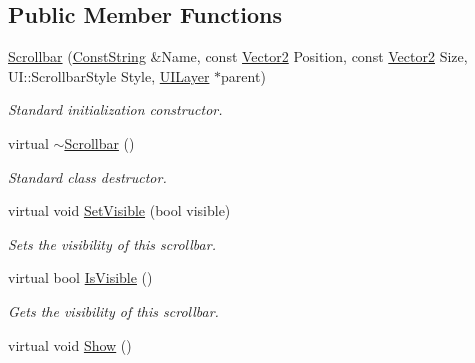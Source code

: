 \subsection*{Public Member Functions}
\begin{DoxyCompactItemize}
\item 
\hyperlink{classphys_1_1UI_1_1Scrollbar_a25d95bba23d00bd2e377258068e4a0bb}{Scrollbar} (\hyperlink{namespacephys_a5ce5049f8b4bf88d6413c47b504ebb31}{ConstString} \&Name, const \hyperlink{classphys_1_1Vector2}{Vector2} Position, const \hyperlink{classphys_1_1Vector2}{Vector2} Size, UI::ScrollbarStyle Style, \hyperlink{classphys_1_1UILayer}{UILayer} $\ast$parent)
\begin{DoxyCompactList}\small\item\em Standard initialization constructor. \item\end{DoxyCompactList}\item 
\hypertarget{classphys_1_1UI_1_1Scrollbar_af9fb189c7856353a930c0a228fc0cf42}{
virtual \hyperlink{classphys_1_1UI_1_1Scrollbar_af9fb189c7856353a930c0a228fc0cf42}{$\sim$Scrollbar} ()}
\label{d0/d3e/classphys_1_1UI_1_1Scrollbar_af9fb189c7856353a930c0a228fc0cf42}

\begin{DoxyCompactList}\small\item\em Standard class destructor. \item\end{DoxyCompactList}\item 
virtual void \hyperlink{classphys_1_1UI_1_1Scrollbar_a2d8997e0bbbb1c17af5128fea98fb1e4}{SetVisible} (bool visible)
\begin{DoxyCompactList}\small\item\em Sets the visibility of this scrollbar. \item\end{DoxyCompactList}\item 
virtual bool \hyperlink{classphys_1_1UI_1_1Scrollbar_a213c946ccadd3b689f59e2761a1d1848}{IsVisible} ()
\begin{DoxyCompactList}\small\item\em Gets the visibility of this scrollbar. \item\end{DoxyCompactList}\item 
\hypertarget{classphys_1_1UI_1_1Scrollbar_a42955ae0e2b273ca9ea392a8dbc62604}{
virtual void \hyperlink{classphys_1_1UI_1_1Scrollbar_a42955ae0e2b273ca9ea392a8dbc62604}{Show} ()}
\label{d0/d3e/classphys_1_1UI_1_1Scrollbar_a42955ae0e2b273ca9ea392a8dbc62604}


\end{DoxyCompactItemize}
